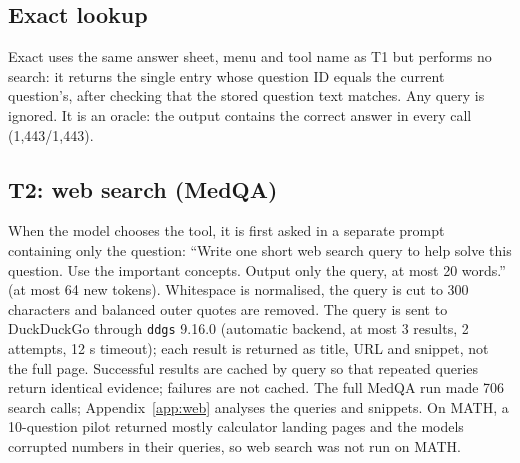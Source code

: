 \subsection{Exact lookup}
Exact uses the same answer sheet, menu and tool name as T1 but performs no search: it returns the single entry whose question ID equals the current question's, after checking that the stored question text matches. Any query is ignored. It is an oracle: the output contains the correct answer in every call (1,443/1,443).

\subsection{T2: web search (MedQA)}
When the model chooses the tool, it is first asked in a separate prompt containing only the question: ``Write one short web search query to help solve this question. Use the important concepts. Output only the query, at most 20 words.'' (at most 64 new tokens). Whitespace is normalised, the query is cut to 300 characters and balanced outer quotes are removed. The query is sent to DuckDuckGo through \texttt{ddgs} 9.16.0 (automatic backend, at most 3 results, 2 attempts, 12 s timeout); each result is returned as title, URL and snippet, not the full page. Successful results are cached by query so that repeated queries return identical evidence; failures are not cached. The full MedQA run made 706 search calls; Appendix~\ref{app:web} analyses the queries and snippets. On MATH, a 10-question pilot returned mostly calculator landing pages and the models corrupted numbers in their queries, so web search was not run on MATH.

